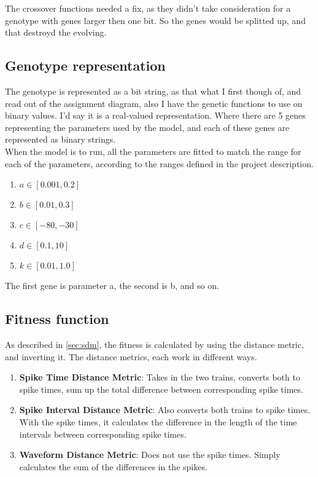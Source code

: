 The crossover functions needed a fix, as they didn't take consideration for a genotype with genes larger
then one bit. So the genes would be splitted up, and that destroyd the evolving. 


\subsection{Genotype representation}
\label{sec:genotype}

The genotype is represented as a bit string, as that what I first though of, and read out of the assignment 
diagram, also I have the genetic functions to use on binary values. I'd say it is a real-valued representation. 
Where there are 5 genes representing the parameters used by the model, and each of these genes are 
represented as binary strings.  \\ 

When the model is to run, all the parameters are fitted to match the range for each of the parameters, according
to the ranges defined in the project description. 

\begin{enumerate}

	\item $a  \in  [0.001, 0.2] $
	\item $b  \in  [0.01, 0.3] $
	\item $c  \in  [-80, -30] $
	\item $d  \in  [0.1,10] $
	\item $k  \in  [0.01, 1.0] $

\end{enumerate}
 
 The first gene is parameter a, the second is b, and so on. 
 

\subsection{Fitness function}

As described in \autoref{sec:sdm}, the fitness is calculated by using the distance metric, and inverting it. 
The distance metrics, each work in different ways.

\begin{enumerate}

	\item \textbf{Spike Time Distance Metric}: Takes in the two trains, converts both to spike times, sum up the 
	total difference between corresponding spike times. 
	
	\item \textbf{Spike Interval Distance Metric}: Also converts both trains to spike times. With the spike times, 
	it calculates the difference in the length of the time intervals between corresponding spike times. 
	
	\item \textbf{Waveform Distance Metric}: Does not use the spike times. Simply calculates the sum of the 
	differences in the spikes. 
	
\end{enumerate}

